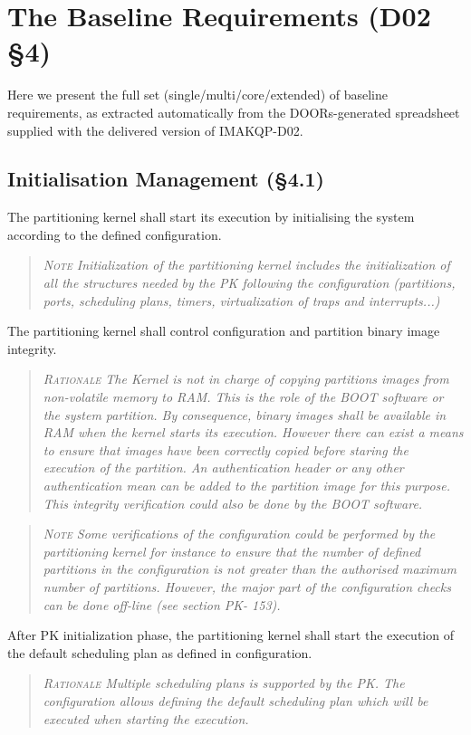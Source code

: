 \section{The Baseline Requirements (D02 \S4)}

Here we present the full set (single/multi/core/extended)
of baseline requirements, as extracted automatically from
the DOORs-generated spreadsheet supplied
with the delivered version of IMAKQP-D02.

\subsection{Initialisation Management (\S4.1)}

The partitioning kernel shall start its execution by initialising the system according to the defined configuration.
\begin{quote}\it
\textsc{Note}
Initialization of the partitioning kernel includes the initialization of all the structures needed by the PK following the configuration (partitions, ports, scheduling plans, timers, virtualization of traps and interrupts...)
\end{quote}

The partitioning kernel shall control configuration and partition binary image integrity.
\begin{quote}\it
\textsc{Rationale}
The Kernel is not in charge of copying partitions images from non-volatile memory to RAM. This is the role of the BOOT software or the system partition. By consequence, binary images shall be available in RAM when the kernel starts its execution. However there can exist a means to ensure that images have been correctly copied before staring the execution of the partition. An authentication header or any other authentication mean can be added to the partition image for this purpose. This integrity verification could also be done by the BOOT software.
\end{quote}
\begin{quote}\it
\textsc{Note}
Some verifications of the configuration could be performed by the partitioning kernel for instance to ensure that the number of defined partitions in the configuration is not greater than the authorised maximum number of partitions. However, the major part of the configuration checks can be done off-line (see section PK- 153).
\end{quote}

After PK initialization phase, the partitioning kernel shall start the execution of the default scheduling plan as defined in configuration.
\begin{quote}\it
\textsc{Rationale}
Multiple scheduling plans is supported by the PK. The configuration allows defining the default scheduling plan which will be executed when starting the execution.
\end{quote}

